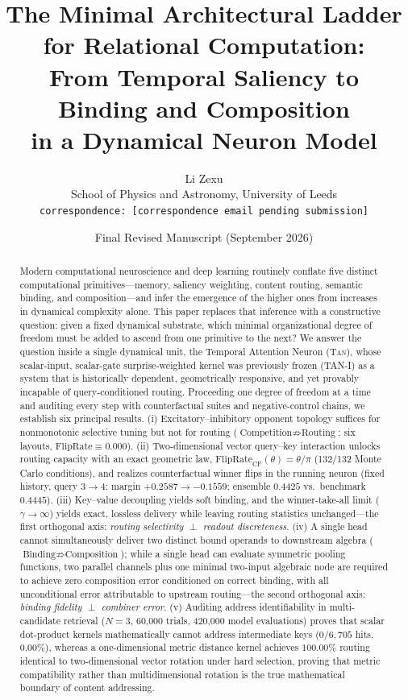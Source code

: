 \documentclass[11pt,a4paper]{article}
\title{\bf The Minimal Architectural Ladder for Relational Computation:\\[0.5ex]
From Temporal Saliency to Binding and Composition\\in a Dynamical Neuron Model}
\author{Li Zexu\\
School of Physics and Astronomy, University of Leeds\\
\texttt{correspondence: [correspondence email pending submission]}}
\date{Final Revised Manuscript (September 2026)}
\newcommand{\TAN}{\textsc{Tan}}
\theoremstyle{remark}
\begin{document}
\maketitle

\begin{abstract}
Modern computational neuroscience and deep learning routinely conflate five
distinct computational primitives---memory, saliency weighting, content
routing, semantic binding, and composition---and infer the emergence of the
higher ones from increases in dynamical complexity alone. This paper replaces
that inference with a constructive question: given a fixed dynamical substrate,
which minimal organizational degree of freedom must be added to ascend from one
primitive to the next? We answer the question inside a single dynamical unit,
the Temporal Attention Neuron (\TAN), whose scalar-input, scalar-gate
surprise-weighted kernel was previously frozen (TAN-I) as a system that is
historically dependent, geometrically responsive, and yet provably incapable of
query-conditioned routing. Proceeding one degree of freedom at a time and
auditing every step with counterfactual suites and negative-control chains, we
establish six principal results. (i) Excitatory--inhibitory opponent topology suffices
for nonmonotonic selective tuning but not for routing
($\text{Competition}\not\Rightarrow\text{Routing}$; six layouts,
$\mathrm{FlipRate}\equiv0.000$). (ii) Two-dimensional vector query--key
interaction unlocks routing capacity with an exact geometric law,
$\mathrm{FlipRate}_{\mathrm{CF}}(\theta)=\theta/\pi$ (132/132 Monte Carlo
conditions), and realizes counterfactual winner flips in the running neuron
(fixed history, query $3\to4$: margin $+0.2587\to-0.1559$; ensemble
$0.4425$ vs.\ benchmark $0.4445$). (iii) Key--value decoupling yields soft
binding, and the winner-take-all limit ($\gamma\to\infty$) yields exact,
lossless delivery while leaving routing statistics unchanged---the first
orthogonal axis: \emph{routing selectivity $\perp$ readout discreteness}.
(iv) A single head cannot simultaneously deliver two distinct bound operands to downstream algebra ($\text{Binding}\not\Rightarrow
\text{Composition}$); while a single head can evaluate symmetric pooling functions, two parallel channels plus one minimal two-input
algebraic node are required to achieve zero composition error conditioned on correct binding,
with all unconditional error attributable to upstream routing---the second
orthogonal axis: \emph{binding fidelity $\perp$ combiner error}.
(v) Auditing address identifiability in multi-candidate retrieval ($N=3$, 60,000 trials, 420,000 model evaluations) proves that scalar dot-product kernels mathematically cannot address intermediate keys ($0/6{,}705$ hits, $0.00\%$), whereas a one-dimensional metric distance kernel achieves $100.00\%$ routing identical to two-dimensional vector rotation under hard selection, proving that metric compatibility rather than multidimensional rotation is the true mathematical boundary of content addressing.

\end{abstract}
\end{document}
